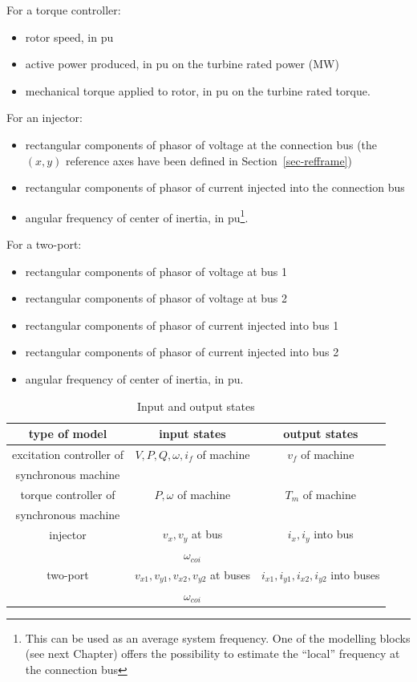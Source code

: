 For a torque controller:
\begin{itemize}
\item[$\omega$] rotor speed, in pu
\item[$P$] active power produced, in pu on the turbine rated power (MW)
\item[$T_m$] mechanical torque applied to rotor, in pu on the turbine rated torque.
\end{itemize}

For an injector:
\begin{itemize}
\item[$v_x, v_y$] rectangular components of phasor of voltage at the connection bus (the $(x,y)$ reference axes have been defined in Section~\ref{sec-refframe})
\item[$i_x, i_y$] rectangular components of phasor of current injected into the connection bus
\item[$\omega_{coi}$] angular frequency of center of inertia, in pu\footnote{This can be used as an average system frequency. One of the modelling blocks (see next Chapter) offers the possibility to estimate the ``local'' frequency at the connection bus}.
\end{itemize}

For a two-port:
\begin{itemize}
\item[$v_{x1}, v_{y1}$] rectangular components of phasor of voltage at bus 1
\item[$v_{x2}, v_{y2}$] rectangular components of phasor of voltage at bus 2
\item[$i_{x1}, i_{y1}$] rectangular components of phasor of current injected into bus 1
\item[$i_{x2}, i_{y2}$] rectangular components of phasor of current injected into bus 2
\item[$\omega_{coi}$] angular frequency of center of inertia, in pu.
\end{itemize}

\begin{table}[t!]
\centering
\caption{Input and output states}\label{tab-in_out_states}
\begin{tabular}{|c|c|c|}
\hline
type of model       & input states & output states  \\ \hline \hline
excitation controller of & $V, P, Q, \omega, i_f$ of machine & $v_f$  of machine \\
synchronous machine &  &  \\ \hline
torque controller of  & $P, \omega$ of machine & $T_m$  of machine \\
synchronous machine & &  \\ \hline
injector & $v_x, v_y$ at bus & $i_x, i_y$ into bus  \\ 
         & $\omega_{coi}$ & \\ \hline
two-port & $v_{x1}, v_{y1}, v_{x2}, v_{y2}$ at buses & $i_{x1}, i_{y1}, i_{x2}, i_{y2}$ into buses \\
         & $\omega_{coi}$ &  \\
\hline
\end{tabular}
\end{table}

